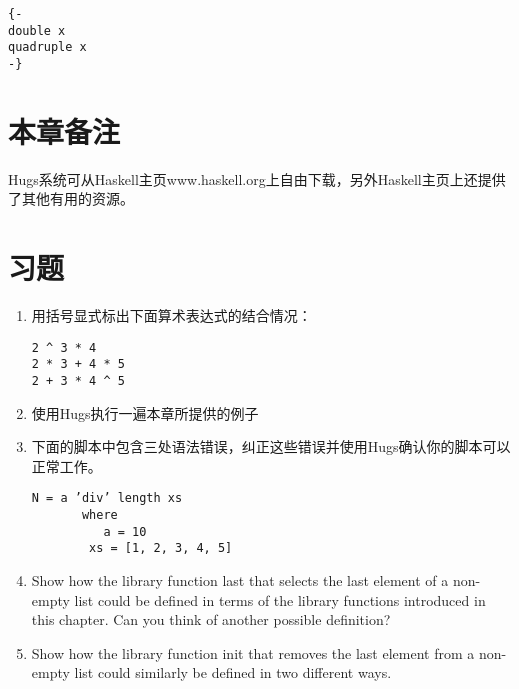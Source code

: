 \begin{verbatim}
{-
double x
quadruple x
-}
\end{verbatim}

\section{本章备注}
Hugs系统可从Haskell主页www.haskell.org上自由下载，另外Haskell主页上还提供了其他有用的资源。

\section{习题}

\begin{enumerate}
\item 用括号显式标出下面算术表达式的结合情况：
\begin{verbatim}
2 ^ 3 * 4
2 * 3 + 4 * 5 
2 + 3 * 4 ^ 5
\end{verbatim}

\item 使用Hugs执行一遍本章所提供的例子

\item
下面的脚本中包含三处语法错误，纠正这些错误并使用Hugs确认你的脚本可以正常工作。
\begin{verbatim}
N = a ’div’ length xs
       where
          a = 10
        xs = [1, 2, 3, 4, 5]
\end{verbatim}

\item Show how the library function last that selects the last element of a
non-empty list could be defined in terms of the library functions introduced
in this chapter. Can you think of another possible definition?

\item Show how the library function init that removes the last element from a
non-empty list could similarly be defined in two different ways.
\end{enumerate}
